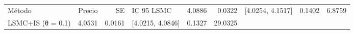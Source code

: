 \begin{tabular}{lrrlrr}
\toprule
Método & Precio & SE & IC 95 %
\midrule
LSMC & 4.0886 & 0.0322 & [4.0254, 4.1517] & 0.1402 & 6.8759 \\
LSMC+IS (θ = 0.1) & 4.0531 & 0.0161 & [4.0215, 4.0846] & 0.1327 & 29.0325 \\
\bottomrule
\end{tabular}

